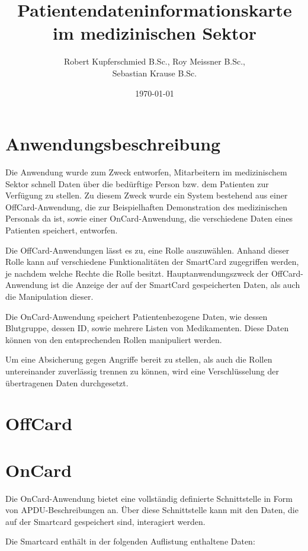 \documentclass[parskip]{scrartcl}
\begin{document}
	\subject{Projektdokumentation im Modul Smartcard}
	\title{Patientendateninformationskarte im medizinischen Sektor}
	\author{Robert Kupferschmied B.Sc., Roy Meissner B.Sc.,\\Sebastian Krause B.Sc.}
	\date{\today}
	
	\maketitle
	
	\onehalfspacing
	\section{Anwendungsbeschreibung}
		Die Anwendung wurde zum Zweck entworfen, Mitarbeitern im medizinischem Sektor schnell Daten über die bedürftige Person bzw. dem Patienten zur Verfügung zu stellen. Zu diesem Zweck wurde ein System bestehend aus einer OffCard-Anwendung, die zur Beispielhaften Demonstration des medizinischen Personals da ist, sowie einer OnCard-Anwendung, die verschiedene Daten eines Patienten speichert, entworfen.
		
		Die OffCard-Anwendungen lässt es zu, eine Rolle auszuwählen. Anhand dieser Rolle kann auf verschiedene Funktionalitäten der SmartCard zugegriffen werden, je nachdem welche Rechte die Rolle besitzt. Hauptanwendungszweck der OffCard-Anwendung ist die Anzeige der auf der SmartCard gespeicherten Daten, als auch die Manipulation dieser.
		
		Die OnCard-Anwendung speichert Patientenbezogene Daten, wie dessen Blutgruppe, dessen ID, sowie mehrere Listen von Medikamenten. Diese Daten können von den entsprechenden Rollen manipuliert werden.
		
		Um eine Absicherung gegen Angriffe bereit zu stellen, als auch die Rollen untereinander zuverlässig trennen zu können, wird eine Verschlüsselung der übertragenen Daten durchgesetzt.
	\section{OffCard}
	\section{OnCard}
		Die OnCard-Anwendung bietet eine vollständig definierte Schnittstelle in Form von APDU-Beschreibungen an. Über diese Schnittstelle kann mit den Daten, die auf der Smartcard gespeichert sind, interagiert werden.
		
		Die Smartcard enthält in der folgenden Auflistung enthaltene Daten:
		
\end{document}
